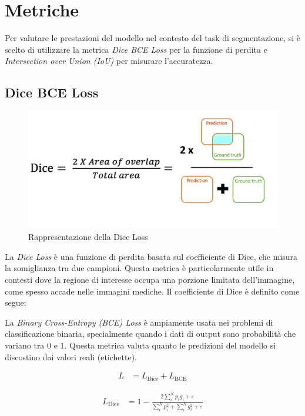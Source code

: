 \section{Metriche}
\label{sec:metriche}

Per valutare le prestazioni del modello nel contesto del task di segmentazione, si è scelto di
utilizzare la metrica \textit{Dice BCE Loss} per la funzione di perdita e \textit{Intersection over
Union (IoU)} per misurare l'accuratezza.

\subsection{Dice BCE Loss}
\begin{figure}[!ht]
  \centering
  \includegraphics[width=0.7\columnwidth]{Immagini/dice_loss.png}
  \caption{Rappresentazione della Dice Loss}
  \label{fig:dice_loss}
\end{figure}

La \textit{Dice Loss} è una funzione di perdita basata sul coefficiente di Dice, che misura la
somiglianza tra due campioni. Questa metrica è particolarmente utile in contesti dove la regione di
interesse occupa una porzione limitata dell'immagine, come spesso accade nelle immagini mediche. Il
coefficiente di Dice è definito come segue:

La \textit{Binary Cross-Entropy (BCE) Loss} è ampiamente usata nei problemi di classificazione
binaria, specialmente quando i dati di output sono probabilità che variano tra 0 e 1. Questa metrica
valuta quanto le predizioni del modello si discostino dai valori reali (etichette).

\begin{align}
    L & = L_{\text{Dice}} + L_{\text{BCE}}
    \label{eq:dice_bce_loss}
\end{align}

\begin{align}
    L_{\text{Dice}} & = 1 - \frac{2\sum_i^N p_i g_i + \varepsilon}{\sum_i^N p_i^2 + \sum_i^N g_i^2 + \varepsilon}
    \label{eq:dice_loss}
\end{align}

